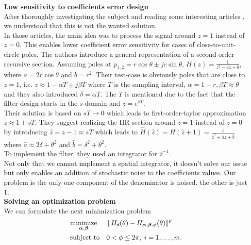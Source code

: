 \documentclass[12pt]{article}
\begin{document}
\textbf{Low sensitivity to coefficients error design}
\\
After thoroughly investigating the subject and reading some interesting articles \cite{Agarwal1975NewNoise,Li1993RoundoffRealizations,Kauraniemi1998DeltaFilters}, we understood that this is not the wanted solution.
\\
In those articles, the main idea was to process the signal around $ z=1 $ instead of $ z=0 $. This enables lower coefficient error sensitivity for cases of close-to-unit-circle poles. The authors introduce a general representation of a second order recursive section. Assuming poles at $ p_{1,2} = r\cos{\theta} \pm jr\sin{\theta} $, $ H(z) = \frac{1}{z^{2}-az+b} $, where $ a = 2r\cos{\theta} $ and $ b = r^{2} $. Their test-case is obviously poles that are close to $ z=1 $, i.e. $ z \approx 1-\alpha T \pm j\beta T $ where $ T $ is the sampling interval, $ \alpha = 1-r, \beta T \approx \theta $ and they also introduced $ \delta = \alpha T $. The $ T $ is mentioned due to the fact that the filter design starts in the $ s $-domain and $ z=e^{sT} $.
\\
Their solution is based on $ sT \rightarrow 0 $ which leads to first-order-taylor approximation $ z \approx 1+sT $. They suggest realizing the IIR section around $ z=1 $ instead of $ z=0 $ by introducing $ \hat{z} = z-1 \approx sT $ which leads to $ \hat{H}\left(\hat{z}\right) = H\left( \hat{z}+1 \right) = \frac{1}{\hat{z}^{2}+\hat{a}z+\hat{b}} $ where $ \hat{a} \approx 2\delta+\theta^{2} $ and $ \hat{b} = \delta^2 + \theta^2 $. 
\\
To implement the filter, they used an integrator for $ \hat{z}^{-1} $.
\\
Not only that we cannot implement a spatial integrator, it doesn't solve our issue but only enables an addition of stochastic noise  to the coefficients values.
Our problem is the only one component of the denominator is noised, the other is just $ 1 $.
\\
\textbf{Solving an optimization problem}
\\
We can formulate the next minimization problem 
\begin{equation*}
\begin{aligned}
& \underset{\boldsymbol{\alpha},\boldsymbol{\beta}}{\text{minimize}}
& & 
\left\lVert 
H_{d}(\theta) - H_{\boldsymbol{\alpha},\boldsymbol{\beta},\phi}(\theta)
\right\rVert^p
\\
& \text{subject to}
& & 0 < \phi \leq 2\pi, \; i = 1, \ldots, m.
\end{aligned}
\end{equation*}
\end{document}

